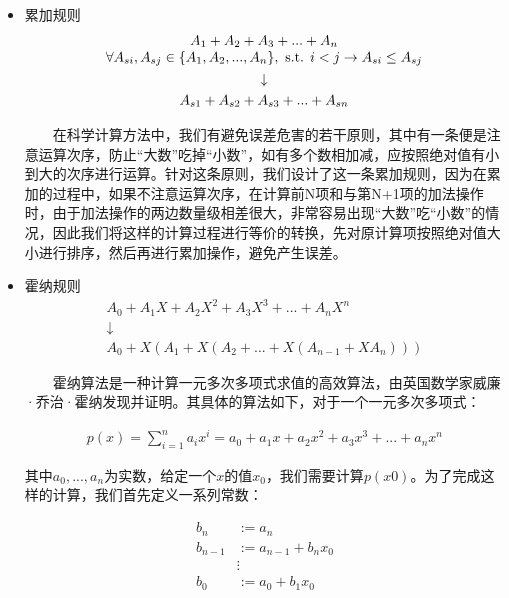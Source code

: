 \begin{itemize}
  \item {\kaishu 累加规则} 
  \begin{gather*}
  \begin{array}{@{}c@{}} A_1 + A_2 + A_3 + ... + A_n \\ \forall A_{si}, A_{sj} \in \{A_1, A_2, ... , A_n\}, \text{ s.t. } i<j \rightarrow     A_{si}\leq A_{sj} \end{array} \\
  \downarrow \\
  A_{s1} + A_{s2} + A_{s3} + ... + A_{sn}
  \end{gather*}

  　　在科学计算方法中，我们有避免误差危害的若干原则，其中有一条便是注意运算次序，防止“大数”吃掉“小数”，如有多个数相加减，应按照绝对值有小到大的次序进行运算。针对这条原则，我们设计了这一条累加规则，因为在累加的过程中，如果不注意运算次序，在计算前N项和与第N+1项的加法操作时，由于加法操作的两边数量级相差很大，非常容易出现“大数”吃“小数”的情况，因此我们将这样的计算过程进行等价的转换，先对原计算项按照绝对值大小进行排序，然后再进行累加操作，避免产生误差。\\

  \item {\kaishu 霍纳规则} 
  \begin{gather*}
  A_0 + A_1X + A_2X^2 + A_3X^3 + ... + A_nX^n \\
  \downarrow \\
  A_0 + X(A_1 + X(A_2 + ... + X(A_{n-1} + XA_n)))
  \end{gather*}

  　　霍纳算法是一种计算一元多次多项式求值的高效算法，由英国数学家威廉·乔治·霍纳发现并证明。其具体的算法如下，对于一个一元多次多项式：

  \begin{gather*}
    p(x) = \sum_{i=1}^{n} a_ix^i = a_0+a_1x+a_2x^2+a_3x^3+...+a_nx^n
  \end{gather*}

  其中$a_0,...,a_n$为实数，给定一个$x$的值$x_0$，我们需要计算$p(x0)$。为了完成这样的计算，我们首先定义一系列常数：

  \begin{equation*}
    \begin{split}
    b_n & := a_n \\
    b_{n-1} & := a_{n-1} + b_nx_0 \\
    & \vdots  \\
    b_0 & := a_0 + b_1x_0
    \end{split}
  \end{equation*}


\end{itemize}
